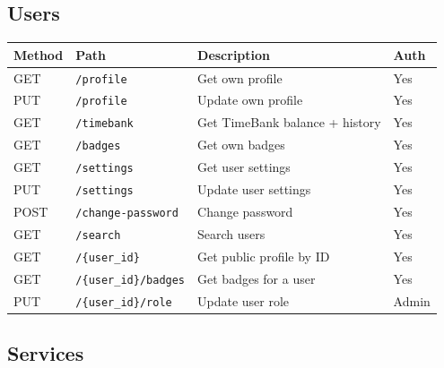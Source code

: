 \documentclass[11pt,a4paper]{report}
\begin{document}
\subsection{Users}

\begin{longtable}{|l|p{6.5cm}|p{5cm}|l|}
    \hline
    \textbf{Method} & \textbf{Path}                 & \textbf{Description}           & \textbf{Auth} \\
    \hline
    \endhead
    GET             & \texttt{/profile}             & Get own profile                & Yes           \\
    \hline
    PUT             & \texttt{/profile}             & Update own profile             & Yes           \\
    \hline
    GET             & \texttt{/timebank}            & Get TimeBank balance + history & Yes           \\
    \hline
    GET             & \texttt{/badges}              & Get own badges                 & Yes           \\
    \hline
    GET             & \texttt{/settings}            & Get user settings              & Yes           \\
    \hline
    PUT             & \texttt{/settings}            & Update user settings           & Yes           \\
    \hline
    POST            & \texttt{/change-password}     & Change password                & Yes           \\
    \hline
    GET             & \texttt{/search}              & Search users                   & Yes           \\
    \hline
    GET             & \texttt{/\{user\_id\}}        & Get public profile by ID       & Yes           \\
    \hline
    GET             & \texttt{/\{user\_id\}/badges} & Get badges for a user          & Yes           \\
    \hline
    PUT             & \texttt{/\{user\_id\}/role}   & Update user role               & Admin         \\
    \hline
\end{longtable}

\subsection{Services}
\end{document}
